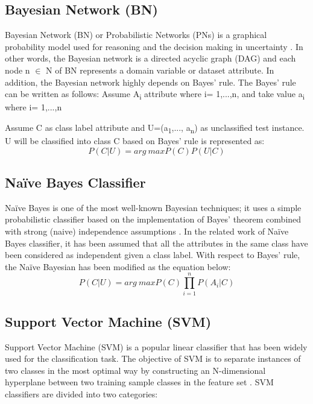 \documentclass[review]{elsarticle}
\begin{document}
\subsection{Bayesian Network (BN)}
\label{subsec:BN}
Bayesian Network (BN) or Probabilistic Networks (PNs) is a graphical probability model used for reasoning and the decision making in uncertainty \cite{Friedman1998}. In other words, the Bayesian network is a directed acyclic graph (DAG) and each node n $\in$ N of BN represents a domain variable or dataset attribute. In addition, the Bayesian network highly depends on Bayes’ rule. The Bayes' rule can be written as follows: 
 	Assume A\textsubscript{i}  attribute where i= 1,...,n, and take value a\textsubscript{i}  where i= 1,...,n
 	
Assume C as class label attribute and U=(a\textsubscript{1},..., a\textsubscript{n}) as unclassified test instance. U will be classified into class C based on Bayes’ rule is represented as:
 	\begin{equation}
 	P(C|U)=arg\ max P(C)P(U|C)
 	\label{eq:BN}
 	\end{equation}
 	
\subsection{Na\"ive Bayes Classifier}
\label{subsec:Naive}
Na\"ive Bayes is one of the most well-known Bayesian techniques; it uses a simple probabilistic classifier based on the implementation of Bayes' theorem combined with strong (naive) independence assumptions \cite{Lowd2005}. In the related work of Na\"ive Bayes classifier, it has been assumed that all the attributes in the same class have been considered as independent given a class label. With respect to Bayes’ rule, the Na\"ive Bayesian has been modified as the equation below:
 	\begin{equation}
 	P(C|U) = arg\ max P(C) \prod_{i=1}^n P(A_i|C)
 	\label{eq:Naive}
 	\end{equation}
 	
\subsection{Support Vector Machine (SVM)}
\label{subsec:SVM}
Support Vector Machine (SVM) is a popular linear classifier that has been widely used for the classification task. The objective of SVM is to separate instances of two classes in the most optimal way by constructing an N-dimensional hyperplane between two training sample classes in the feature set \cite{Cortes1995}. SVM classifiers are divided into two categories: \\
\end{document}
